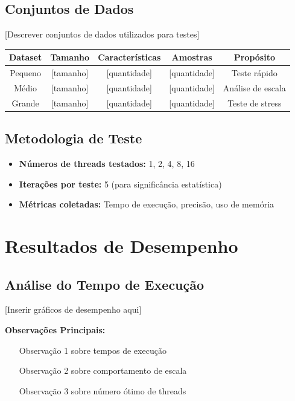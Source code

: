 \documentclass[a4paper,11pt]{article}
\begin{document}
\subsection{Conjuntos de Dados}
[Descrever conjuntos de dados utilizados para testes]

\begin{table}[H]
\centering
\begin{tabular}{|c|c|c|c|c|}
\hline
\textbf{Dataset} & \textbf{Tamanho} & \textbf{Características} & \textbf{Amostras} & \textbf{Propósito} \\
\hline
Pequeno & [tamanho] & [quantidade] & [quantidade] & Teste rápido \\
\hline
Médio & [tamanho] & [quantidade] & [quantidade] & Análise de escala \\
\hline
Grande & [tamanho] & [quantidade] & [quantidade] & Teste de stress \\
\hline
\end{tabular}
\end{table}

\subsection{Metodologia de Teste}
\begin{itemize}
    \item \textbf{Números de threads testados:} 1, 2, 4, 8, 16
    \item \textbf{Iterações por teste:} 5 (para significância estatística)
    \item \textbf{Métricas coletadas:} Tempo de execução, precisão, uso de memória
\end{itemize}

\section{Resultados de Desempenho}

\subsection{Análise do Tempo de Execução}

[Inserir gráficos de desempenho aqui]

\textbf{Observações Principais:}
\begin{itemize}
    \item [Observação 1 sobre tempos de execução]
    \item [Observação 2 sobre comportamento de escala]
    \item [Observação 3 sobre número ótimo de threads]
\end{itemize}
\end{document}
